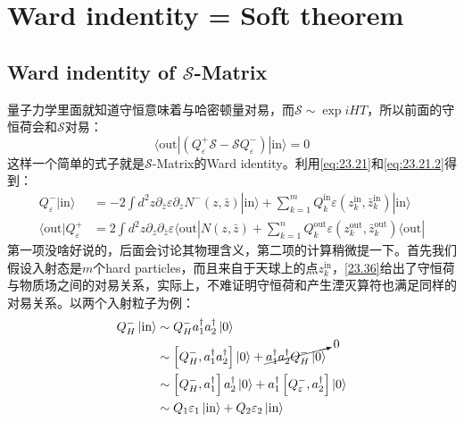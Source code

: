 \section{Ward indentity = Soft theorem}
\subsection{Ward indentity of $\mathcal{S}$\mbox{-}Matrix}
量子力学里面就知道守恒意味着与哈密顿量对易，而$\mathcal{S}\sim \exp{iHT}$，所以前面的守恒荷会和$\mathcal{S}$对易：
\begin{equation}\label{eq:24.1}
	\boxed{\langle\mathrm{out}|\left(Q_\varepsilon^+\mathcal{S}-\mathcal{S}Q_\varepsilon^-\right)|\mathrm{in}\rangle=0}
\end{equation}
这样一个简单的式子就是$\mathcal{S}$\mbox{-}Matrix的Ward identity。利用\ref{eq:23.21}和\ref{eq:23.21.2}得到：
\begin{equation}
	\begin{aligned}
		Q_\varepsilon^-|\mathrm{in}\rangle&=-2\int d^2z\partial_{\bar{z}}\varepsilon\partial_zN^-(z,\bar{z})|\mathrm{in}\rangle+\sum_{k=1}^mQ_k^\mathrm{in}\varepsilon(z_k^\mathrm{in},\bar{z}_k^\mathrm{in})|\mathrm{in}\rangle \\
		\langle\mathrm{out}|Q_\varepsilon^+&=2\int d^2z\partial_z\partial_{\bar{z}}\varepsilon\langle\mathrm{out}|N(z,\bar{z})+\sum_{k=1}^nQ_k^\mathrm{out}\varepsilon(z_k^\mathrm{out},\bar{z}_k^\mathrm{out})\langle\mathrm{out}|
	\end{aligned}
\end{equation}
第一项没啥好说的，后面会讨论其物理含义，第二项的计算稍微提一下。首先我们假设入射态是$m$个hard particles，而且来自于天球上的点$z_k^{\mathrm{in}}$，\ref{23.36}给出了守恒荷与物质场之间的对易关系，实际上，不难证明守恒荷和产生湮灭算符也满足同样的对易关系。以两个入射粒子为例：
\begin{equation}
	\begin{aligned}
		Q^-_{H}\ket{\text{in}}&\sim Q^-_{H}a_1^\dagger a_2^\dagger\ket{0}\\
		&\sim \left[Q^-_{H},a_1^\dagger a_2^\dagger\right]\ket{0}+\cancelto{0}{a_1^\dagger a_2^\dagger Q^-_{H}\ket{0}}\\
		&\sim  \left[Q^-_{H},a_1^\dagger \right]a_2^\dagger\ket{0}+a_1^\dagger\left[Q^-_{\varepsilon},a_2^\dagger \right]\ket{0}\\
		&\sim Q_1\varepsilon_1\ket{\text{in}}+Q_2\varepsilon_2\ket{\text{in}}
	\end{aligned}
\end{equation}

